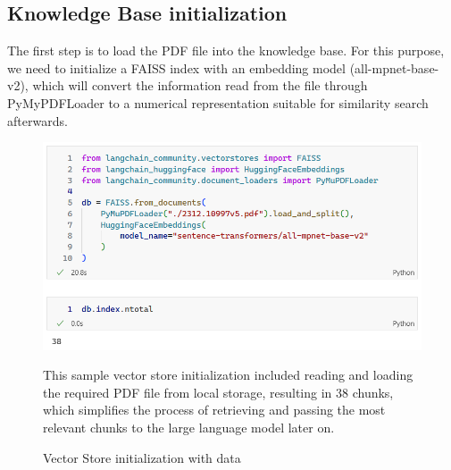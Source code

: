 \subsection{Knowledge Base initialization}
The first step is to load the PDF file into the knowledge base. For this purpose, we need to initialize a FAISS index with an embedding model (all-mpnet-base-v2), which will convert the information read from the file through PyMyPDFLoader to a numerical representation suitable for similarity search afterwards.
\begin{figure}[H]
    \centering
    \includegraphics[width=\linewidth]{./figures/vectorstore_init.png}
    \caption{Vector Store initialization with data}
    \begin{flushleft}
        \small This sample vector store initialization included reading and loading the required PDF file from local storage, resulting in 38 chunks, which simplifies the process of retrieving and passing the most relevant chunks to the large language model later on.
    \end{flushleft}
\end{figure}
